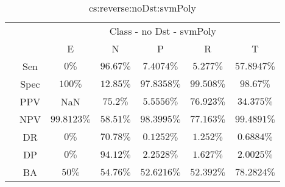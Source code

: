 \begin{table}[!ht]
	\centering
	\begin{tabular}{|c|c|c|c|c|c|c|}
		\cline{3-7}
		\multicolumn{2}{c|}{} & \multicolumn{5}{c|}{Class - no Dst - svmPoly} \\ \cline{3-7}
		\multicolumn{2}{c|}{} & E & N & P & R & T \\ \hline
		\multirow{7}{*}{\rotatebox{90}{Statistics}} & Sen & $0\%$ & $96.67\%$ & $7.4074\%$ & $5.277\%$ & $57.8947\%$ \\ \cline{2-7}
		 & Spec & $100\%$ & $12.85\%$ & $97.8358\%$ & $99.508\%$ & $98.67\%$ \\ \cline{2-7}
		 & PPV & NaN & $75.2\%$ & $5.5556\%$ & $76.923\%$ & $34.375\%$ \\ \cline{2-7}
		 & NPV & $99.8123\%$ & $58.51\%$ & $98.3995\%$ & $77.163\%$ & $99.4891\%$ \\ \cline{2-7}
		 & DR & $0\%$ & $70.78\%$ & $0.1252\%$ & $1.252\%$ & $0.6884\%$ \\ \cline{2-7}
		 & DP & $0\%$ & $94.12\%$ & $2.2528\%$ & $1.627\%$ & $2.0025\%$ \\ \cline{2-7}
		 & BA & $50\%$ & $54.76\%$ & $52.6216\%$ & $52.392\%$ & $78.2824\%$ \\ \hline
	\end{tabular}
	\caption{cs:reverse:noDst:svmPoly}
	\label{tab:cs:reverse:noDst:svmPoly}
\end{table}
